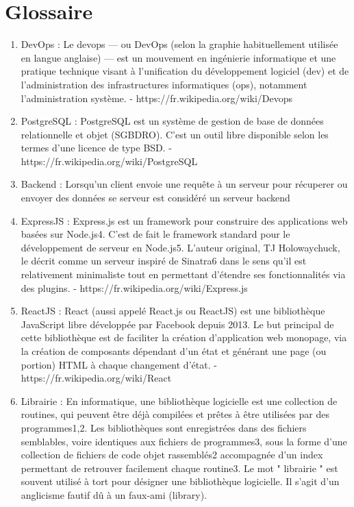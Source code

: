 \documentclass[12pt]{article}
\begin{document}
\begin {sloppypar}
\section{Glossaire}
\begin{enumerate}
  \item 
    DevOps : Le devops — ou DevOps (selon la graphie habituellement utilisée en langue anglaise) —
    est un mouvement en ingénierie informatique et une pratique technique visant à l'unification du développement logiciel (dev) et de l'administration des infrastructures informatiques (ops), notamment l'administration système. 
    - https://fr.wikipedia.org/wiki/Devops
  \item 
    PostgreSQL : PostgreSQL est un système de gestion de base de données relationnelle et objet (SGBDRO). C'est un outil libre disponible selon les termes d'une licence de type BSD. 
    - https://fr.wikipedia.org/wiki/PostgreSQL
  \item 
    Backend : Lorsqu'un client envoie une requête à un serveur pour récuperer ou envoyer des données se serveur est considéré un serveur backend
  \item 
    ExpressJS : Express.js est un framework pour construire des applications web basées sur Node.js4. C'est de fait le framework standard pour le développement de serveur en Node.js5. L'auteur original, TJ Holowaychuck, le décrit comme un serveur inspiré de Sinatra6 dans le sens qu'il est relativement minimaliste tout en permettant d'étendre ses fonctionnalités via des plugins. 
    - https://fr.wikipedia.org/wiki/Express.js
  \item 
    ReactJS : React (aussi appelé React.js ou ReactJS) est une bibliothèque JavaScript libre développée par Facebook depuis 2013. Le but principal de cette bibliothèque est de faciliter la création d'application web monopage, via la création de composants dépendant d'un état et générant une page (ou portion) HTML à chaque changement d'état. 
    - https://fr.wikipedia.org/wiki/React
  \item 
    Librairie : En informatique, une bibliothèque logicielle est une collection de routines, qui peuvent être déjà compilées et prêtes à être utilisées par des programmes1,2.
    Les bibliothèques sont enregistrées dans des fichiers semblables, voire identiques aux fichiers de programmes3, sous la forme d'une collection de fichiers de code objet rassemblés2 accompagnée d'un index permettant de retrouver facilement chaque routine3. Le mot " librairie " est souvent utilisé à tort pour désigner une bibliothèque logicielle. Il s'agit d'un anglicisme fautif dû à un faux-ami (library). 

\end{enumerate}
\end{sloppypar}
\end{document}
